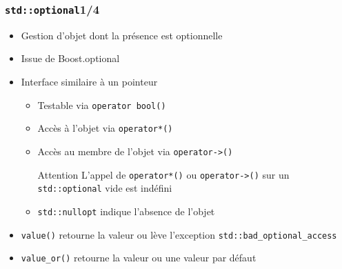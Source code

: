 \documentclass[C++.tex]{subfiles}
\begin{document}
\begin{frame}[fragile]
	\frametitle{\lstinline|std::optional|\titlehfill{}1/4}
	\begin{itemize}
		\item Gestion d'objet dont la présence est optionnelle
		\item Issue de Boost.optional
		\item Interface similaire à un pointeur
		\begin{itemize}
			\item Testable via \lstinline|operator bool()|
			\item Accès à l'objet via \lstinline|operator*()|
			\item Accès au membre de l'objet via \lstinline|operator->()|

			\begin{alertblock}{Attention}
				L'appel de \lstinline|operator*()| ou \lstinline|operator->()| sur un \lstinline|std::optional| vide est indéfini
			\end{alertblock}

			\item \lstinline|std::nullopt| indique l'absence de l'objet
		\end{itemize}

		\item \lstinline|value()| retourne la valeur ou lève l'exception \lstinline|std::bad_optional_access|
		\item \lstinline|value_or()| retourne la valeur ou une valeur par défaut
	\end{itemize}
\end{frame}
\end{document}
